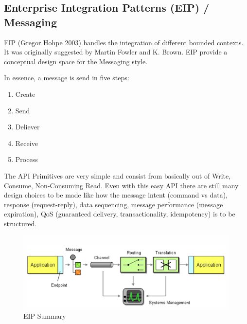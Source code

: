 \documentclass[../Main.tex]{subfiles}
\begin{document}
\newpage
\subsection{Enterprise Integration Patterns (EIP) / Messaging}
EIP (Gregor Hohpe 2003) handles the integration of different bounded contexts.
It was originally suggested by Martin Fowler and K. Brown.
EIP provide a conceptual design space for the Messaging style.

\begin{multicols}{2}
    In essence, a message is send in five steps:
    \begin{enumerate}
        \item Create
        \item Send
        \item Deliever
        \item Receive
        \item Process
    \end{enumerate}

    The API Primitives are very simple and consist from basically out of Write, Consume, Non-Consuming Read.
    Even with this easy API there are still many design choices to be made like
    how the message intent (command vs data), response (request-reply), data sequencing, message performance (message expiration),
    QoS (guaranteed delivery, transactionality, idempotency) is to be structured.
\end{multicols}

\begin{figure}[H]
    \centering
    \includegraphics[width=0.75\linewidth]{Images/eip-overview.png}
    \caption{EIP Summary}
\end{figure}
\newpage
\end{document}
